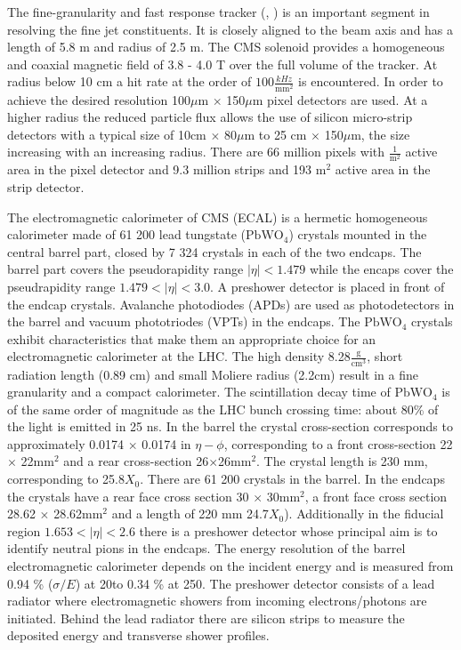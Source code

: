 The fine-granularity and fast response tracker (\cite{Karimaki:368412}, \cite{tracker_addendum}) is an important segment in resolving the fine jet constituents. It is closely aligned to the beam axis and has a length of 5.8 m and radius of 2.5 m. The CMS solenoid provides a homogeneous and coaxial magnetic field of 3.8 - 4.0 T over the full volume of the tracker. At radius below 10 cm a hit rate at the order of $100\frac{kHz}{\text{mm}^2}$ is encountered. In order to achieve the desired resolution 100$\mu$m $\times$ 150$\mu$m pixel detectors are used. At a higher radius the reduced particle flux allows the use of silicon micro-strip detectors with a typical size of 10cm $\times$ 80$\mu$m to 25 cm $\times$ 150$\mu$m, the size increasing with an increasing radius. There are 66 million pixels with $\frac{1}{\text{m}^2}$ active area in the pixel detector and 9.3 million strips and 193 m${}^2$ active area in the strip detector.

The electromagnetic calorimeter of CMS (ECAL) is a hermetic homogeneous calorimeter made of 61 200 lead tungstate ($\text{PbWO}_{4}$) crystals mounted in the central barrel part, closed by 7 324 crystals in each of the two endcaps. The barrel part covers the pseudorapidity range $\left|\eta\right|<1.479$ while the encaps cover the pseudrapidity range $1.479<\left|\eta\right|<3.0$. A preshower detector is placed in front of the endcap crystals. Avalanche photodiodes (APDs) are used as photodetectors in the barrel and vacuum phototriodes (VPTs) in the endcaps. The $\text{PbWO}_{4}$ crystals exhibit characteristics that make them an appropriate choice for an electromagnetic calorimeter at the LHC. The high density 8.28$\frac{\text{g}}{\text{cm}^3}$, short radiation length (0.89 cm)  and small Moliere radius (2.2cm) result in a fine granularity and a compact calorimeter. The scintillation decay time of $\text{PbWO}_{4}$ is of the same order of magnitude as the LHC bunch crossing time:
about 80\% of the light is emitted in 25 ns. In the barrel the crystal cross-section corresponds to approximately 0.0174 $\times$ 0.0174 in $\eta - \phi$, corresponding to a front cross-section 22 $\times$ 22$\text{mm}^2$ and a rear cross-section 26$\times$26$\text{mm}^2$. The crystal length is 230 mm, corresponding to 25.8$X_{0}$. There are 61 200 crystals in the barrel. In the endcaps the crystals have a rear face cross section 30 $\times$ 30$\text{mm}^2$, a front face cross section 28.62 $\times$ 28.62$\text{mm}^2$ and a length of 220 mm 24.7$X_{0}$). Additionally in the fiducial region $1.653 < \left|\eta\right| <2.6$ there is a preshower detector whose principal aim is to identify neutral pions in the endcaps. The energy resolution of the barrel electromagnetic calorimeter depends on the incident energy and is measured from 0.94 \% ($\sigma/E$) at 20\GeV to 0.34 \% at 250\GeV \cite{Adzic:2007mi}. The preshower detector consists of a lead radiator where electromagnetic showers from incoming electrons/photons are initiated. Behind the lead radiator there are silicon strips to measure the deposited energy and transverse shower profiles.

